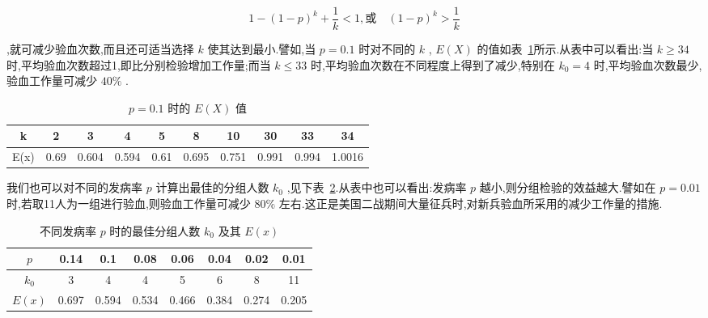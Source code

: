 \[ 
1-(1-p)^{k}+\frac{1}{k}<1, \text{或} \quad(1-p)^{k}>\frac{1}{k}
\]

,就可减少验血次数,而且还可适当选择 $ k $ 使其达到最小.譬如,当 $ p=0.1 $ 时对不同的 $ k $ , $ E(X) $ 的值如表~\ref{tab:2.21}所示.从表中可以看出:当 $ k \geqslant 34 $ 时,平均验血次数超过1,即比分别检验增加工作量;而当 $ k \leqslant 33 $ 时,平均验血次数在不同程度上得到了减少,特别在 $ k_{0}=4 $ 时,平均验血次数最少,验血工作量可减少 $ 40\% $ .

\begin{table}[htbp]
	\centering
	\caption{ $ p=0.1 $ 时的 $ E(X) $ 值}
	\begin{tabular}{c|ccccccccc}
		\toprule
		k     & 2     & 3     & 4     & 5     & 8     & 10    & 30    & 33    & 34 \\\midrule
		E(x)  & 0.69  & 0.604 & 0.594 & 0.61  & 0.695 & 0.751 & 0.991 & 0.994 & 1.0016 \\\bottomrule
	\end{tabular}%
	\label{tab:2.21}%
\end{table}%


我们也可以对不同的发病率 $ p $ 计算出最佳的分组人数 $ k_0 $ ,见下表~\ref{tab:2.2.2}.从表中也可以看出:发病率 $ p $ 越小,则分组检验的效益越大.譬如在 $ p=0.01 $ 时,若取11人为一组进行验血,则验血工作量可减少 $ 80\% $ 左右.这正是美国二战期间大量征兵时,对新兵验血所采用的减少工作量的措施.

\begin{table}[htbp]
	\centering
	\caption{不同发病率 $ p $ 时的最佳分组人数 $ k_0 $ 及其 $ E(x) $ }
	\begin{tabular}{c|ccccccc}
		\toprule
		 $ p $ & 0.14  & 0.1   & 0.08  & 0.06  & 0.04  & 0.02  & 0.01 \\\midrule
		 $ k_0 $ & 3     & 4     & 4     & 5     & 6     & 8     & 11 \\\midrule
		 $ E(x) $ & 0.697 & 0.594 & 0.534 & 0.466 & 0.384 & 0.274 & 0.205 \\\bottomrule
	\end{tabular}%
	\label{tab:2.2.2}%
\end{table}%

